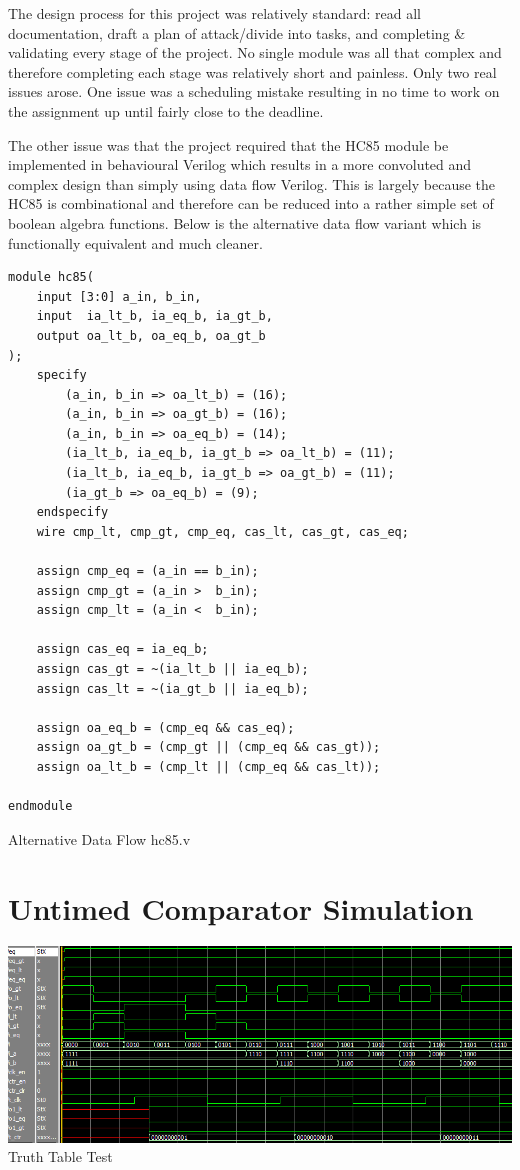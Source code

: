 \documentclass[12pt,letterpaper,titlepage]{article}
\begin{document}
\begin{raggedright}
The design process for this project was relatively standard: read all documentation, draft a plan of attack/divide into tasks, and completing \& validating every stage of the project. No single module was all that complex and therefore completing each stage was relatively short and painless. Only two real issues arose. One issue was a scheduling mistake resulting in no time to work on the assignment up until fairly close to the deadline. 

The other issue was that the project required that the HC85 module be implemented in behavioural Verilog which results in a more convoluted and complex design than simply using data flow Verilog. This is largely because the HC85 is combinational and therefore can be reduced into a rather simple set of boolean algebra functions. Below is the alternative data flow variant which is functionally equivalent and much cleaner.
\begin{center}
\centering
\begin{lstlisting}
module hc85(
    input [3:0] a_in, b_in,
    input  ia_lt_b, ia_eq_b, ia_gt_b,
    output oa_lt_b, oa_eq_b, oa_gt_b
);
    specify
        (a_in, b_in => oa_lt_b) = (16);
        (a_in, b_in => oa_gt_b) = (16);
        (a_in, b_in => oa_eq_b) = (14);
        (ia_lt_b, ia_eq_b, ia_gt_b => oa_lt_b) = (11);
        (ia_lt_b, ia_eq_b, ia_gt_b => oa_gt_b) = (11);
        (ia_gt_b => oa_eq_b) = (9);
    endspecify
    wire cmp_lt, cmp_gt, cmp_eq, cas_lt, cas_gt, cas_eq;

    assign cmp_eq = (a_in == b_in);
    assign cmp_gt = (a_in >  b_in);
    assign cmp_lt = (a_in <  b_in);

    assign cas_eq = ia_eq_b;
    assign cas_gt = ~(ia_lt_b || ia_eq_b);
    assign cas_lt = ~(ia_gt_b || ia_eq_b);

    assign oa_eq_b = (cmp_eq && cas_eq);
    assign oa_gt_b = (cmp_gt || (cmp_eq && cas_gt));
    assign oa_lt_b = (cmp_lt || (cmp_eq && cas_lt));

endmodule
\end{lstlisting}

Alternative Data Flow hc85.v
\end{center}

\clearpage
\section{Untimed Comparator Simulation}
\begin{center}
\includegraphics[width=\textwidth]{tb_ut_red}
Truth Table Test
\end{center}


\end{raggedright}
\end{document}
